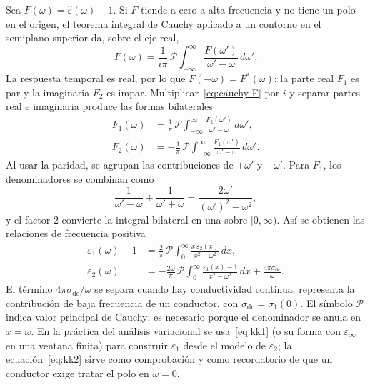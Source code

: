 Sea $F(\omega)=\hat\varepsilon(\omega)-1$. Si $F$ tiende a cero a alta frecuencia y no tiene un polo en el origen, el teorema integral de Cauchy aplicado a un contorno en el semiplano superior da, sobre el eje real,
\begin{equation}
\label{eq:cauchy-F}
F(\omega)=\frac{1}{i\pi}\,\mathcal{P}\!\int_{-\infty}^{\infty}\frac{F(\omega')}{\omega'-\omega}\,d\omega'.
\end{equation}
La respuesta temporal es real, por lo que $F(-\omega)=F^*(\omega)$: la parte real $F_1$ es par y la imaginaria $F_2$ es impar. Multiplicar~\eqref{eq:cauchy-F} por $i$ y separar partes real e imaginaria produce las formas bilaterales
\begin{align}
F_1(\omega)&=\frac{1}{\pi}\,\mathcal{P}\!\int_{-\infty}^{\infty}\frac{F_2(\omega')}{\omega'-\omega}\,d\omega',\\
F_2(\omega)&=-\frac{1}{\pi}\,\mathcal{P}\!\int_{-\infty}^{\infty}\frac{F_1(\omega')}{\omega'-\omega}\,d\omega'.
\end{align}
Al usar la paridad, se agrupan las contribuciones de $+\omega'$ y $-\omega'$. Para $F_1$, los denominadores se combinan como
\begin{equation}
\frac{1}{\omega'-\omega}+\frac{1}{\omega'+\omega}=\frac{2\omega'}{(\omega')^{2}-\omega^{2}},
\end{equation}
y el factor $2$ convierte la integral bilateral en una sobre $[0,\infty)$. As\'i se obtienen las relaciones de frecuencia positiva
\begin{align}
\label{eq:kk1}
\varepsilon_1(\omega)-1
&=\frac{2}{\pi}\,\mathcal{P}\!\int_{0}^{\infty}
\frac{x\,\varepsilon_2(x)}{x^{2}-\omega^{2}}\,dx,\\
\label{eq:kk2}
\varepsilon_2(\omega)
&=-\frac{2\omega}{\pi}\,\mathcal{P}\!\int_{0}^{\infty}
\frac{\varepsilon_1(x)-1}{x^{2}-\omega^{2}}\,dx
+\frac{4\pi\sigma_{\mathrm{dc}}}{\omega}.
\end{align}
El t\'ermino $4\pi\sigma_{\mathrm{dc}}/\omega$ se separa cuando hay conductividad continua: representa la contribuci\'on de baja frecuencia de un conductor, con $\sigma_{\mathrm{dc}}=\sigma_1(0)$. El s\'imbolo $\mathcal{P}$ indica valor principal de Cauchy; es necesario porque el denominador se anula en $x=\omega$.
En la pr\'actica del an\'alisis variacional se usa~\eqref{eq:kk1} (o su forma con $\varepsilon_\infty$ en una ventana finita) para construir $\varepsilon_1$ desde el modelo de $\varepsilon_2$; la ecuaci\'on~\eqref{eq:kk2} sirve como comprobaci\'on y como recordatorio de que un conductor exige tratar el polo en $\omega=0$.

